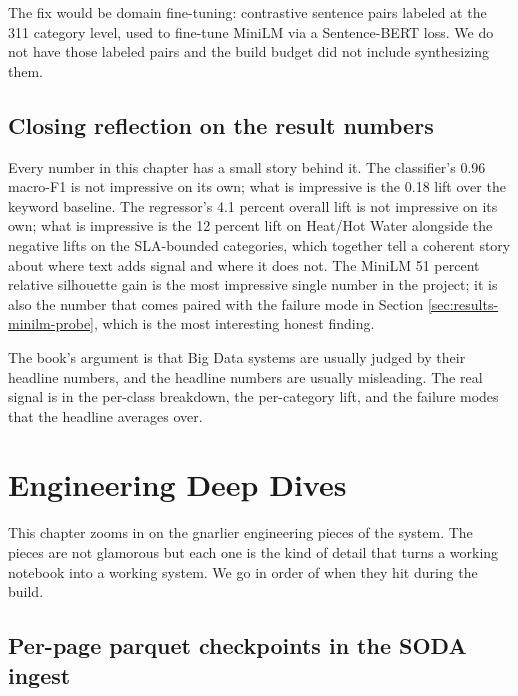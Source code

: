 \documentclass[11pt,letterpaper]{book}
\begin{document}
The fix would be domain fine-tuning: contrastive sentence pairs labeled at the 311 category level, used to fine-tune MiniLM via a Sentence-BERT loss. We do not have those labeled pairs and the build budget did not include synthesizing them.

\section{Closing reflection on the result numbers}

Every number in this chapter has a small story behind it. The classifier's 0.96 macro-F1 is not impressive on its own; what is impressive is the 0.18 lift over the keyword baseline. The regressor's 4.1 percent overall lift is not impressive on its own; what is impressive is the 12 percent lift on Heat/Hot Water alongside the negative lifts on the SLA-bounded categories, which together tell a coherent story about where text adds signal and where it does not. The MiniLM 51 percent relative silhouette gain is the most impressive single number in the project; it is also the number that comes paired with the failure mode in Section \ref{sec:results-minilm-probe}, which is the most interesting honest finding.

The book's argument is that Big Data systems are usually judged by their headline numbers, and the headline numbers are usually misleading. The real signal is in the per-class breakdown, the per-category lift, and the failure modes that the headline averages over.


\chapter{Engineering Deep Dives}
\label{ch:deep-dives}

This chapter zooms in on the gnarlier engineering pieces of the system. The pieces are not glamorous but each one is the kind of detail that turns a working notebook into a working system. We go in order of when they hit during the build.

\section{Per-page parquet checkpoints in the SODA ingest}
\end{document}
